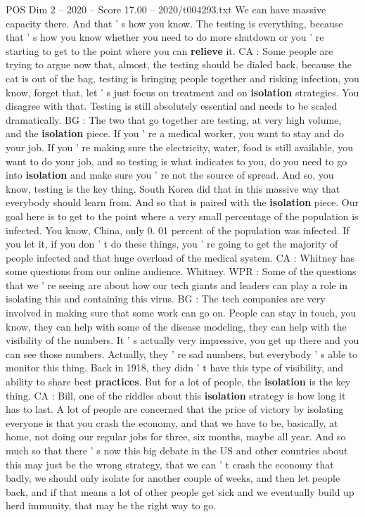 \begin{textsample}{POS Dim 2 – 2020 – Score 17.00 – 2020/t004293.txt}
We can have massive capacity there.
And that ' s how you know.
The testing is everything, because that ' s how you know whether you need to do more shutdown or you ' re starting to get to the point where you can \textbf{relieve} it.
CA : Some people are trying to argue now that, almost, the testing should be dialed back, because the cat is out of the bag, testing is bringing people together and risking infection, you know, forget that, let ' s just focus on treatment and on \textbf{isolation} strategies.
You disagree with that.
Testing is still absolutely essential and needs to be scaled dramatically.
BG : The two that go together are testing, at very high volume, and the \textbf{isolation} piece.
If you ' re a medical worker, you want to stay and do your job.
If you ' re making sure the electricity, water, food is still available, you want to do your job, and so testing is what indicates to you, do you need to go into \textbf{isolation} and make sure you ' re not the source of spread.
And so, you know, testing is the key thing.
South Korea did that in this massive way that everybody should learn from.
And so that is paired with the \textbf{isolation} piece.
Our goal here is to get to the point where a very small percentage of the population is infected.
You know, China, only 0. 01 percent of the population was infected.
If you let it, if you don ' t do these things, you ' re going to get the majority of people infected and that huge overload of the medical system.
CA : Whitney has some questions from our online audience.
Whitney.
WPR : Some of the questions that we ' re seeing are about how our tech giants and leaders can play a role in isolating this and containing this virus.
BG : The tech companies are very involved in making sure that some work can go on.
People can stay in touch, you know, they can help with some of the disease modeling, they can help with the visibility of the numbers.
It ' s actually very impressive, you get up there and you can see those numbers.
Actually, they ' re sad numbers, but everybody ' s able to monitor this thing.
Back in 1918, they didn ' t have this type of visibility, and ability to share best \textbf{practices}.
But for a lot of people, the \textbf{isolation} is the key thing.
CA : Bill, one of the riddles about this \textbf{isolation} strategy is how long it has to last.
A lot of people are concerned that the price of victory by isolating everyone is that you crash the economy, and that we have to be, basically, at home, not doing our regular jobs for three, six months, maybe all year.
And so much so that there ' s now this big debate in the US and other countries about this may just be the wrong strategy, that we can ' t crash the economy that badly, we should only isolate for another couple of weeks, and then let people back, and if that means a lot of other people get sick and we eventually build up herd immunity, that may be the right way to go.

\end{textsample}
